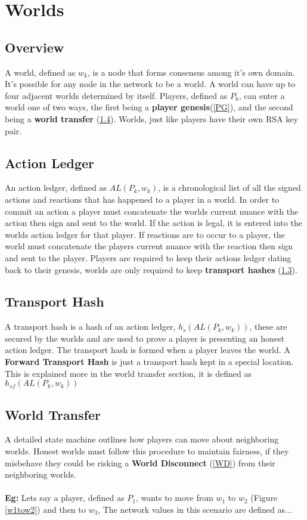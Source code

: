 \documentclass[runningheads,a4paper]{llncs}
\begin{document}
\section{Worlds}
\subsection{Overview}
A world, defined as $w_k$, is a node that forms consensus among it's own domain. It's possible for any node in the network to be a world. A world can have up to four adjacent worlds determined by itself. Players, defined as $P_k$, can enter a world one of two ways, the first being a \textbf{player genesis}(\ref{PG}), and the second being a \textbf{world transfer} (\ref{WT}). Worlds, just like players have their own RSA key pair. 


\subsection{Action Ledger}
\label{AL}
An action ledger, defined as $AL(P_{k}, w_k)$, is a chronological list of all the signed actions and reactions that has happened to a player in a world. In order to commit an action a player must concatenate the worlds current nuance with the action then sign and sent to the world. If the action is legal, it is entered into the worlds action ledger for that player. If reactions are to occur to a player, the world must concatenate the players current nuance with the reaction then sign and sent to the player. Players are required to keep their actions ledger dating back to their genesis, worlds are only required to keep \textbf{transport hashes} (\ref{TH}).

\subsection{Transport Hash}
\label{TH}
A transport hash is a hash of an action ledger, $h_s(AL(P_{k}, w_k))$, these are secured by the worlds and are used to prove a player is presenting an honest action ledger. The transport hash is formed when a player leaves the world. A \textbf{Forward Transport Hash} is just a transport hash kept in a special location. This is explained more in the world transfer section, it is defined as  $h_{sf}(AL(P_{k}, w_k))$

\subsection{World Transfer} 
\label{WT}
A detailed state machine outlines how players can move about neighboring worlds. Honest worlds must follow this procedure to maintain fairness, if they misbehave they could be risking a \textbf{World Disconnect} (\ref{WD}) from their neighboring worlds. 
\\
\\
\textbf{Eg:} Lets say a player, defined as $P_1$, wants to move from $w_1$ to $w_2$ (Figure \ref{w1tow2}) and then to $w_3$, The network values in this scenario are defined as...
\end{document}
